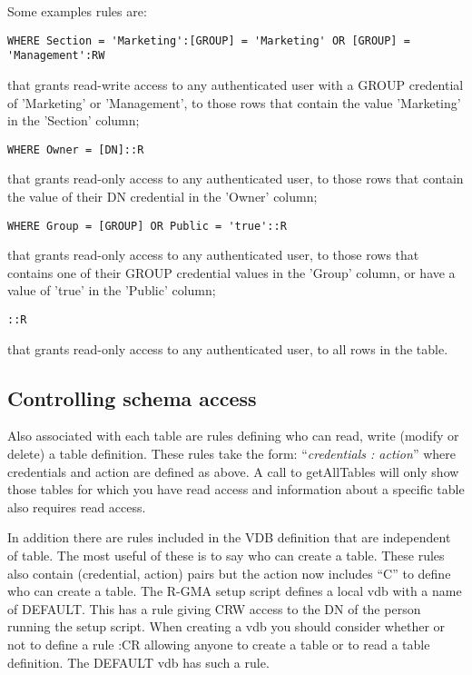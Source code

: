 Some examples rules are:

\begin{verbatim}
WHERE Section = 'Marketing':[GROUP] = 'Marketing' OR [GROUP] = 'Management':RW
\end{verbatim}

that grants read-write access to any authenticated user with a GROUP
credential of 'Marketing' or 'Management', to those rows that contain
the value 'Marketing' in the 'Section' column;

\begin{verbatim}
WHERE Owner = [DN]::R
\end{verbatim}

that grants read-only access to any authenticated user, to those rows
that contain the value of their DN credential in the 'Owner' column;

\begin{verbatim}
WHERE Group = [GROUP] OR Public = 'true'::R
\end{verbatim}

that grants read-only access to any authenticated user, to those rows
that contains one of their GROUP credential values in the 'Group'
column, or have a value of 'true' in the 'Public' column;

\begin{verbatim}
::R
\end{verbatim}

that grants read-only access to any authenticated user, to all rows in
the table.

\subsection{Controlling schema access}
Also associated with each table are rules defining who can read, write (modify
or delete) a table definition. These rules take the form: ``\textit{credentials
: action}'' where credentials and action are defined as above. A call to
getAllTables will only show those tables for which you have read access and
information about a specific table also requires read access. 

In addition there
are rules included in the VDB definition that are independent of table. The most
useful of these is to say who can create a table. These rules also contain
(credential, action) pairs but the action now includes ``C'' to define who can
create a table. The R-GMA setup script defines a local vdb with a name of
DEFAULT. This has a rule giving CRW access to the DN of the person running the
setup script. When creating a vdb you should consider whether or not to define a
rule :CR allowing anyone to create a table or to read a table definition. The
DEFAULT vdb has such a rule.

